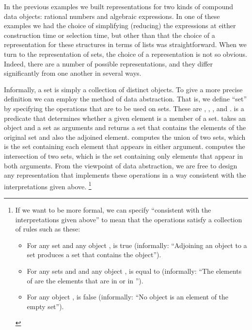 In the previous examples we built representations for two kinds of compound data objects:
rational numbers and algebraic expressions.
In one of these examples we had the choice of simplifying (reducing) the expressions at either construction time or selection time, but other than that the choice of a representation for these structures in terms of lists was straightforward.
When we turn to the representation of sets, the choice of a representation is not so obvious.
Indeed, there are a number of possible representations, and they differ significantly from one another in several ways.

Informally, a set is simply a collection of distinct objects.  To give a more
precise definition we can employ the method of data abstraction.  That is, we
define “set” by specifying the operations that are to be used on sets.  These
are , , , and
.   is a predicate that determines
whether a given element is a member of a set.   takes an
object and a set as arguments and returns a set that contains the elements of
the original set and also the adjoined element.   computes the
union of two sets, which is the set containing each element that appears in
either argument.   computes the intersection of two
sets, which is the set containing only elements that appear in both arguments.
From the viewpoint of data abstraction, we are free to design any
representation that implements these operations in a way consistent with the
interpretations given above.%
\footnote{
	If we want to be more formal, we can specify “consistent with the interpretations given above” to mean that the operations satisfy a collection of rules such as these:
	\begin{itemize}

		\item
			For any set  and any object ,   is true (informally:
			“Adjoining an object to a set produces a set that contains the object”).

		\item
			For any sets  and  and any object ,  is equal to  
			(informally: “The elements of  are the elements that are in  or in ”).

		\item
			For any object ,  is false
			(informally: “No object is an element of the empty set”).
	\end{itemize}
}



